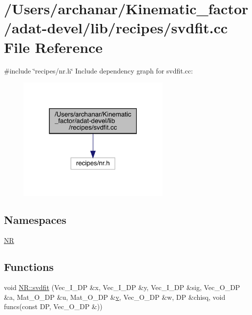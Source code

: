 \hypertarget{adat-devel_2lib_2recipes_2svdfit_8cc}{}\section{/\+Users/archanar/\+Kinematic\+\_\+factor/adat-\/devel/lib/recipes/svdfit.cc File Reference}
\label{adat-devel_2lib_2recipes_2svdfit_8cc}
{\ttfamily \#include \char`\"{}recipes/nr.\+h\char`\"{}}\newline
Include dependency graph for svdfit.\+cc\+:
\nopagebreak
\begin{figure}[H]
\begin{center}
\leavevmode
\includegraphics[width=214pt]{dc/d21/adat-devel_2lib_2recipes_2svdfit_8cc__incl}
\end{center}
\end{figure}
\subsection*{Namespaces}
\begin{DoxyCompactItemize}
\item 
 \mbox{\hyperlink{namespaceNR}{NR}}
\end{DoxyCompactItemize}
\subsection*{Functions}
\begin{DoxyCompactItemize}
\item 
void \mbox{\hyperlink{namespaceNR_afe44878304edad27239234f84f643943}{N\+R\+::svdfit}} (Vec\+\_\+\+I\+\_\+\+DP \&x, Vec\+\_\+\+I\+\_\+\+DP \&y, Vec\+\_\+\+I\+\_\+\+DP \&sig, Vec\+\_\+\+O\+\_\+\+DP \&a, Mat\+\_\+\+O\+\_\+\+DP \&u, Mat\+\_\+\+O\+\_\+\+DP \&\mbox{\hyperlink{adat__devel_2lib_2hadron_2hadron__timeslice_8cc_a716fc87f5e814be3ceee2405ed6ff22a}{v}}, Vec\+\_\+\+O\+\_\+\+DP \&w, DP \&chisq, void funcs(const DP, Vec\+\_\+\+O\+\_\+\+DP \&))
\end{DoxyCompactItemize}
